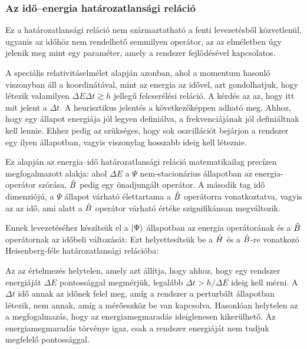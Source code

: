   \subsubsection*{Az idő--energia határozatlansági reláció}\label{ss:energiaidohatarozatlansag}
   
   Ez a határozatlansági reláció nem származtatható a fenti levezetésből közvetlenül, ugyanis az időhöz nem rendelhető semmilyen operátor,  az az elméletben úgy jelenik meg mint egy paraméter, amely a rendszer fejlődésével kapcsolatos. 
   
   A speciális relativitáselmélet alapján azonban, ahol a momentum hasonló viszonyban áll a koordinátával, mint az energia az idővel, azt gondolhatjuk, hogy létezik valamilyen $\Delta E\Delta t\gtrsim h$ jellegű felcserélési reláció. A kérdés az az, hogy itt mit jelent a $\Delta t$. A heurisztikus jelentés a következőképpen adható meg. Ahhoz, hogy egy állapot energiája jól legyen definiálva, a frekvenciájának jól definiáltnak kell lennie. Ehhez pedig az szükséges, hogy sok oszcillációt bejárjon a rendszer egy ilyen állapotban, vagyis viszonylag hosszabb ideig kell léteznie. 
   
   Ez alapján az energia--idő határozatlansági reláció matematikailag precízen megfogalmazott alakja: 
   ahol $\Delta E$ a $\Psi$ nem-stacionárius állapotban az energia-operátor szórása, $\hat{B}$ pedig egy önadjungált operátor. A második tag idő dimenziójú, a $\Psi$ állapot várható élettartama a $\hat{B}$ operátorra vonatkoztatva, vagyis az az idő, ami alatt a $\hat{B}$ operátor várható értéke szignifikánsan megváltozik.
   
   Ennek levezetéséhez készítsük el a $\lvert\Psi\rangle$ állapotban az energia operátorának és a $\hat{B}$ operátornak az időbeli változását:
   Ezt helyettesítsük be a $\hat{H}$ és a $\hat{B}$-re vonatkozó Heisenberg-féle határozatlansági relációba:
   
   Az az értelmezés helytelen, amely azt állítja, hogy ahhoz, hogy egy rendszer energiáját $\Delta E$ pontossággal megmérjük, legalább $\Delta t>h/\Delta E$ ideig kell mérni. A $\Delta t$ idő annak az időnek felel meg, amíg a rendszer a perturbált állapotban létezik, nem annak, amíg a mérőeszköz be van kapcsolva. Hasonlóan helytelen az a megfogalmazás, hogy az energiamegmaradás ideiglenesen kikerülhető. Az energiamegmaradás törvénye igaz, csak a rendszer energiáját nem tudjuk megfelelő pontossággal.
    
